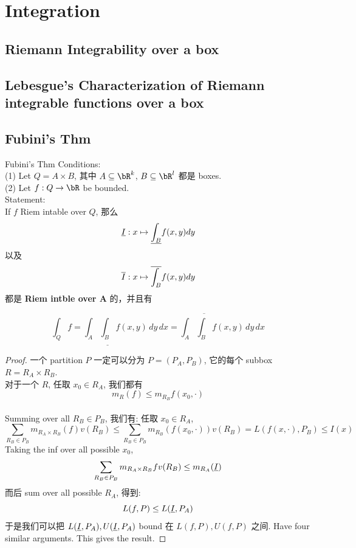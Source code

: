 \chapter{Integration}
\section{Riemann Integrability over a box}



\section{Lebesgue's Characterization of Riemann integrable functions over a box}




\section{Fubini's Thm}
\begin{theorem}{Fubini's Thm}\label{Fubini's Thm}
    Conditions:\\
    (1) Let $Q = A \times B$, 其中 $A \subseteq \bR^k$, $B \subseteq \bR^l$ 都是 boxes.\\
    (2) Let $f: Q \rightarrow \bR$ be bounded.\\
    
    Statement: \\
    If $f$ Riem intable over $Q$, 那么 
    $$
    \underline{I}: x \mapsto \underline{\int_B} f(x,y) dy
    $$
    以及 
    $$
    \overline{I}:  x \mapsto \overline{\int_B} f(x,y) dy
    $$
    都是 \textbf{Riem intble over A} 的，并且有 

    $$
    \int_Q f = \int_A \underline{\int_B} f(x,y) \,dy \,dx = \int_A \overline{\int_B} f(x,y) \,dy \,dx
    $$
    
\end{theorem}
\begin{proof}
    一个 partition $P$ 一定可以分为 $P = (P_A, P_B)$, 它的每个 subbox $R = R_A \times R_B$.\\
    对于一个 $R$, 任取 $x_0 \in R_A$, 我们都有 $$m_R(f) \leq m_{R_B} f(x_0, \cdot)$$\\
    Summing over all $R_B \in P_B$, 我们有: 任取 $x_0 \in R_A$, 
    $$
    \sum_{R_B \in P_B} m_{R_A \times R_B} (f) v(R_B) \leq \sum_{R_B \in P_B} m_{R_B}(f(x_0, \cdot)) v(R_B) = L(f(x,\cdot), P_B) \leq I(x)
    $$
    Taking the inf over all possible $x_0$,
    $$
     \sum_{R_B \in P_B} m_{R_A \times R_B} f v(R_B) \leq m_{R_A}(\underline{I})
    $$
    而后 sum over all possible $R_A$, 得到:
    $$
    L(f,P) \leq L(\underline{I}, P_A)
    $$
    于是我们可以把 $L(\underline{I}, P_A), U(\underline{I}, P_A) $ bound 在 $L(f,P), U(f,P)$ 之间. Have four similar arguments. This gives the result.
\end{proof}



